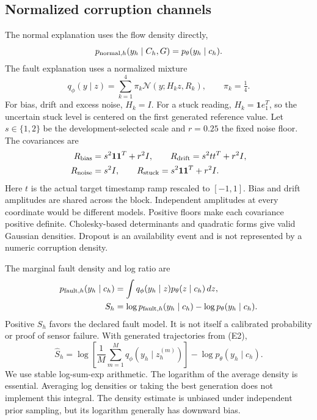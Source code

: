 \documentclass[conference]{IEEEtran}
\newcommand{\1}{\mathbf{1}}
\begin{document}
\subsection{Normalized corruption channels}
The normal explanation uses the flow density directly,
\begin{equation}
 p_{{\rm normal},h}(y_h\mid C_h,G)=p_\theta(y_h\mid c_h).
\end{equation}
The fault explanation uses a normalized mixture
\begin{equation}
 q_\phi(y\mid z)=\sum_{k=1}^{4}\pi_k\mathcal N(y;H_kz,R_k),
 \qquad \pi_k=\tfrac14.
\end{equation}
For bias, drift and excess noise, $H_k=I$. For a stuck reading, $H_k=\1 e_1^T$, so the uncertain stuck level is centered on the first generated reference value. Let $s\in\{1,2\}$ be the development-selected scale and $r=0.25$ the fixed noise floor. The covariances are
\[
\begin{split}
 R_{\rm bias}&=s^2\1\1^T+r^2I,\qquad
 R_{\rm drift}=s^2tt^T+r^2I,\\
 R_{\rm noise}&=s^2I,\qquad
 R_{\rm stuck}=s^2\1\1^T+r^2I.
\end{split}
\]
Here $t$ is the actual target timestamp ramp rescaled to $[-1,1]$. Bias and drift amplitudes are shared across the block. Independent amplitudes at every coordinate would be different models. Positive floors make each covariance positive definite. Cholesky-based determinants and quadratic forms give valid Gaussian densities. Dropout is an availability event and is not represented by a numeric corruption density.

The marginal fault density and log ratio are
\begin{align}
 p_{{\rm fault},h}(y_h\mid c_h)&=\int q_\phi(y_h\mid z)p_\theta(z\mid c_h)\,dz, \\
 S_h&=\log p_{{\rm fault},h}(y_h\mid c_h)-\log p_\theta(y_h\mid c_h).
\end{align}
Positive $S_h$ favors the declared fault model. It is not itself a calibrated probability or proof of sensor failure. With generated trajectories from (E2),
\begin{equation}
 \widehat S_h=\log\left[\frac{1}{M}\sum_{m=1}^{M}q_\phi(y_h\mid z_h^{(m)})\right]
 -\log p_\theta(y_h\mid c_h).
\end{equation}
We use stable log-sum-exp arithmetic. The logarithm of the average density is essential. Averaging log densities or taking the best generation does not implement this integral. The density estimate is unbiased under independent prior sampling, but its logarithm generally has downward bias.
\end{document}
